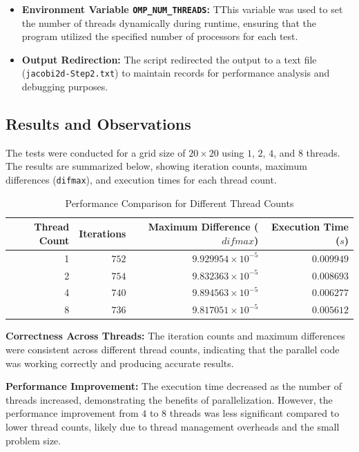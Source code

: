 \documentclass{article}
\begin{document}
    \begin{itemize}
        \item \textbf{Environment Variable \texttt{OMP\_NUM\_THREADS}:} TThis variable was used to set the number of threads dynamically during runtime, ensuring that the program utilized the specified number of processors for each test.
        \item \textbf{Output Redirection:} The script redirected the output to a text file (\texttt{jacobi2d-Step2.txt}) to maintain records for performance analysis and debugging purposes.
    \end{itemize}


\subsection{Results and Observations}

The tests were conducted for a grid size of $20\times20$ using $1$, $2$, $4$, and $8$ threads. The results are summarized below, showing iteration counts, maximum differences (\texttt{difmax}), and execution times for each thread count.

\begin{table}[H]
    \centering
    \caption{Performance Comparison for Different Thread Counts}
    \label{tab:performance_comparison}
    \begin{tabular}{rrrr}
    \toprule
    \textbf{Thread Count} & \textbf{Iterations} & \textbf{Maximum Difference ($difmax$)} & \textbf{Execution Time ($s$)} \\
    \midrule
    1 & $752$ & $9.929954 \times 10^{-5}$ & $0.009949$ \\
    2 & $754$ & $9.832363 \times 10^{-5}$ & $0.008693$ \\
    4 & $740$ & $9.894563 \times 10^{-5}$ & $0.006277$ \\
    8 & $736$ & $9.817051 \times 10^{-5}$ & $0.005612$ \\
    \bottomrule
    \end{tabular}
\end{table}

\textbf{Correctness Across Threads:} The iteration counts and maximum differences were consistent across different thread counts, indicating that the parallel code was working correctly and producing accurate results.

\textbf{Performance Improvement:} The execution time decreased as the number of threads increased, demonstrating the benefits of parallelization. However, the performance improvement from $4$ to $8$ threads was less significant compared to lower thread counts, likely due to thread management overheads and the small problem size.
\end{document}
